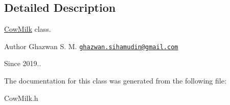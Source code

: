 \subsection{Detailed Description}
\hyperlink{classCowMilk}{Cow\+Milk} class.

\begin{DoxyAuthor}{Author}
Ghazwan S. M. \href{mailto:ghazwan.sihamudin@gmail.com}{\tt ghazwan.\+sihamudin@gmail.\+com} 
\end{DoxyAuthor}
\begin{DoxySince}{Since}
2019.. 
\end{DoxySince}


The documentation for this class was generated from the following file\+:\begin{DoxyCompactItemize}
\item 
Cow\+Milk.\+h\end{DoxyCompactItemize}
